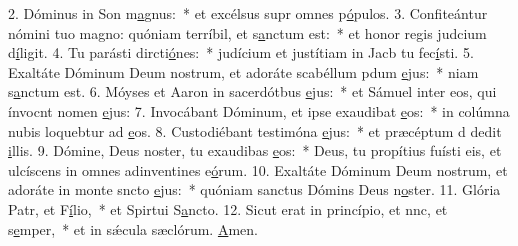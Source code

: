 2. Dóminus in Son m\uline{a}gnus:~* et excélsus supr omnes p\uline{ó}pulos.
3. Confiteántur nómini tuo magno: quóniam terríbil, et s\uline{a}nctum est:~* et honor regis judcium d\uline{í}ligit.
4. Tu parásti dircti\uline{ó}nes:~* judícium et justítiam in Jacb tu fec\uline{í}sti.
5. Exaltáte Dóminum Deum nostrum, et adoráte scabéllum pdum \uline{e}jus:~* niam s\uline{a}nctum est.
6. Móyses et Aaron in sacerdótbus \uline{e}jus:~* et Sámuel inter eos, qui ínvocnt nomen \uline{e}jus:
7. Invocábant Dóminum, et ipse exaudibat \uline{e}os:~* in colúmna nubis loquebtur ad \uline{e}os.
8. Custodiébant testimóna \uline{e}jus:~* et præcéptum d dedit \uline{i}llis.
9. Dómine, Deus noster, tu exaudibas \uline{e}os:~* Deus, tu propítius fuísti eis, et ulcíscens in omnes adinventines e\uline{ó}rum.
10. Exaltáte Dóminum Deum nostrum, et adoráte in monte sncto \uline{e}jus:~* quóniam sanctus Dómins Deus n\uline{o}ster.
11. Glória Patr, et F\uline{í}lio,~* et Spirtui S\uline{a}ncto.
12. Sicut erat in princípio, et nnc, et s\uline{e}mper,~* et in sǽcula sæclórum. \uline{A}men.
